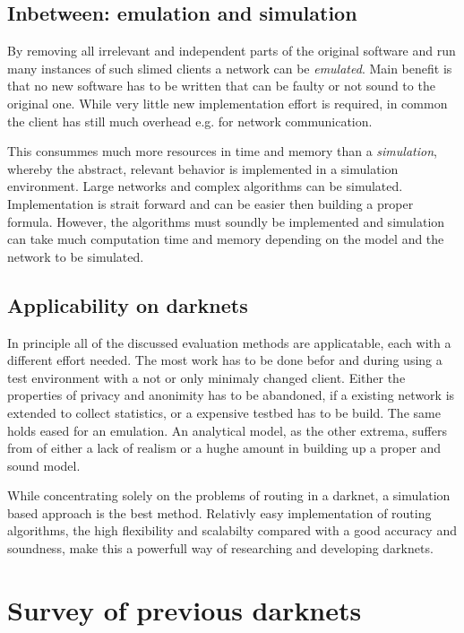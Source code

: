 \subsection{Inbetween: emulation and simulation}

By removing all irrelevant and independent parts of the original software and run many instances of such slimed clients a network can be \emph{emulated}. Main benefit is that no new software has to be written that can be faulty or not sound to the original one. While very little new implementation effort is required, in common the client has still much overhead e.g. for network communication.

This consummes much more resources in time and memory than a \emph{simulation}, whereby the abstract, relevant behavior is implemented in a simulation environment. Large networks and complex algorithms can be simulated. Implementation is strait forward and can be easier then building a proper formula. However, the algorithms must soundly be implemented and simulation can take much computation time and memory depending on the model and the network to be simulated.


\subsection{Applicability on darknets}

In principle all of the discussed evaluation methods are applicatable, each with a different effort needed. The most work has to be done befor and during using a test environment with a not or only minimaly changed client. Either the properties of privacy and anonimity has to be abandoned, if a existing network is extended to collect statistics, or a expensive testbed has to be build. The same holds eased for an emulation. An analytical model, as the other extrema, suffers from of either a lack of realism or a hughe amount in building up a proper and sound model.

While concentrating solely on the problems of routing in a darknet, a simulation based approach is the best method. Relativly easy implementation of routing algorithms, the high flexibility and scalabilty compared with a good accuracy and soundness, make this a powerfull way of researching and developing darknets.

\section{Survey of previous darknets}


